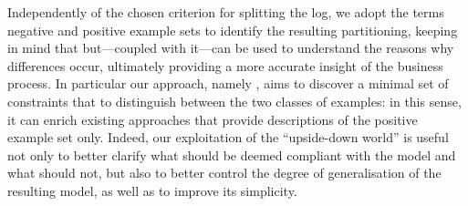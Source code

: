 %
Independently of the chosen criterion for splitting the log, we adopt the terms negative and positive example sets to identify the resulting partitioning, keeping in mind that but---coupled with it---can be used to understand the reasons why differences occur, ultimately providing a more accurate insight of the business process. 
%
%
%
%
In particular our approach, namely \nd, aims to discover a minimal set of constraints that to distinguish between the two classes of examples: in this sense, it can enrich existing approaches that provide descriptions of the positive example set only. Indeed, our exploitation of the ``upside-down world'' is useful not only to better clarify what should be deemed compliant with the model and what should not, but also to better control the degree of generalisation of the resulting model, as well as to improve its simplicity.


